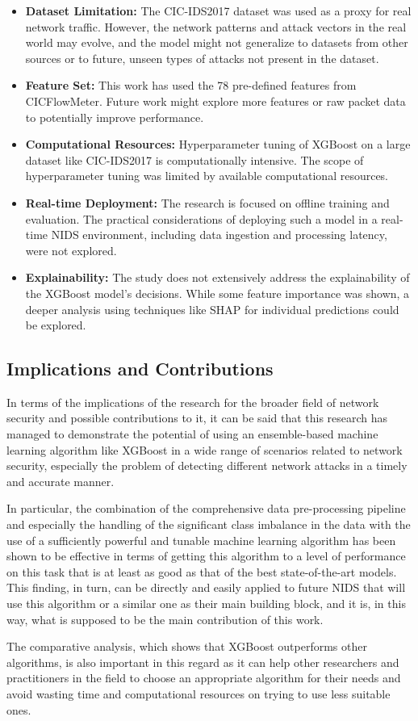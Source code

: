 \begin{itemize}
	\item \textbf{Dataset Limitation: } The CIC-IDS2017 dataset was used as a proxy for real network traffic. However, the network patterns and attack vectors in the real world may evolve, and the model might not generalize to datasets from other sources or to future, unseen types of attacks not present in the dataset.
	\item \textbf{Feature Set: } This work has used the 78 pre-defined features from CICFlowMeter. Future work might explore more features or raw packet data to potentially improve performance.
	\item \textbf{Computational Resources: } Hyperparameter tuning of XGBoost on a large dataset like CIC-IDS2017 is computationally intensive. The scope of hyperparameter tuning was limited by available computational resources.
	\item \textbf{Real-time Deployment: } The research is focused on offline training and evaluation. The practical considerations of deploying such a model in a real-time NIDS environment, including data ingestion and processing latency, were not explored.
	\item \textbf{Explainability: } The study does not extensively address the explainability of the XGBoost model's decisions. While some feature importance was shown, a deeper analysis using techniques like SHAP for individual predictions could be explored.
\end{itemize}

\subsection{Implications and Contributions}

In terms of the implications of the research for the broader field of network security and possible contributions to it, it can be said that this research has managed to demonstrate the potential of using an ensemble-based machine learning algorithm like XGBoost in a wide range of scenarios related to network security, especially the problem of detecting different network attacks in a timely and accurate manner.

In particular, the combination of the comprehensive data pre-processing pipeline and especially the handling of the significant class imbalance in the data with the use of a sufficiently powerful and tunable machine learning algorithm has been shown to be effective in terms of getting this algorithm to a level of performance on this task that is at least as good as that of the best state-of-the-art models. This finding, in turn, can be directly and easily applied to future NIDS that will use this algorithm or a similar one as their main building block, and it is, in this way, what is supposed to be the main contribution of this work.

The comparative analysis, which shows that XGBoost outperforms other algorithms, is also important in this regard as it can help other researchers and practitioners in the field to choose an appropriate algorithm for their needs and avoid wasting time and computational resources on trying to use less suitable ones.

